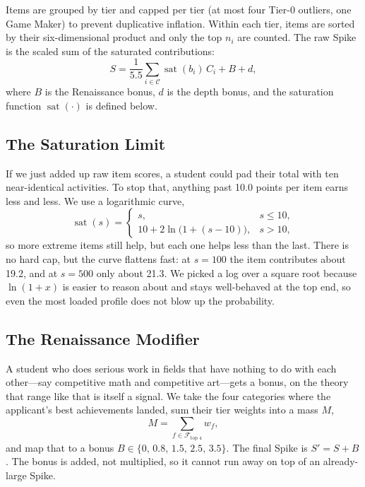 \documentclass[conference]{IEEEtran}
\begin{document}
Items are grouped by tier and capped per tier (at most four Tier-0 outliers, one Game Maker) to prevent duplicative inflation. Within each tier, items are sorted by their six-dimensional product and only the top $n_i$ are counted. The raw Spike is the scaled sum of the saturated contributions:
\begin{equation}
S = \frac{1}{5.5}\sum_{i\in\mathcal{C}} \operatorname{sat}(b_i)\, C_i + B + d,
\end{equation}
where $B$ is the Renaissance bonus, $d$ is the depth bonus, and the saturation function $\operatorname{sat}(\cdot)$ is defined below.

\subsection{The Saturation Limit}
If we just added up raw item scores, a student could pad their total with ten near-identical activities. To stop that, anything past 10.0 points per item earns less and less. We use a logarithmic curve,
\begin{equation}
\operatorname{sat}(s)=
\begin{cases}
s, & s \le 10,\\[2pt]
10 + 2\ln\!\bigl(1 + (s-10)\bigr), & s > 10,
\end{cases}
\end{equation}
so more extreme items still help, but each one helps less than the last. There is no hard cap, but the curve flattens fast: at $s=100$ the item contributes about 19.2, and at $s=500$ only about 21.3. We picked a log over a square root because $\ln(1+x)$ is easier to reason about and stays well-behaved at the top end, so even the most loaded profile does not blow up the probability.

\subsection{The Renaissance Modifier}
A student who does serious work in fields that have nothing to do with each other---say competitive math and competitive art---gets a bonus, on the theory that range like that is itself a signal. We take the four categories where the applicant's best achievements landed, sum their tier weights into a mass $M$,
\begin{equation}
M = \sum_{f\in\mathcal{F}_{\text{top }4}} w_f,
\end{equation}
and map that to a bonus $B\in\{0,\,0.8,\,1.5,\,2.5,\,3.5\}$. The final Spike is $S' = S + B$. The bonus is added, not multiplied, so it cannot run away on top of an already-large Spike.
\end{document}
